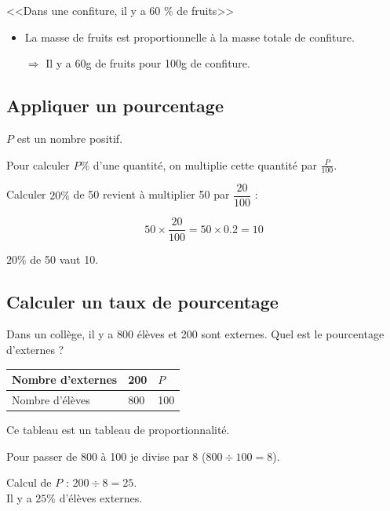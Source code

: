 \documentclass[12pt,a4paper]{article}
\begin{document}
\begin{myex}
	<<Dans une confiture, il y a 60 \% de fruits>>
	\begin{itemize}
		\item La masse de fruits est proportionnelle à la masse totale de confiture.
		\item[$\Rightarrow$] Il y a 60g de fruits pour 100g de confiture.
	\end{itemize}
\end{myex}

\subsection{Appliquer un pourcentage}

\begin{myprop}
	$P$ est un nombre positif.
	
	Pour calculer $P\% $ d'une quantité, on multiplie cette quantité par $\frac{P}{100}$.
\end{myprop}


\begin{myex}
	Calculer $20 \% $ de 50 revient à multiplier 50 par $\dfrac{20}{100}$ :
	
	\begin{equation*}
		50 \times \dfrac{20}{100} = 50 \times \num{0.2} = 10
	\end{equation*}
	
	
	$20 \% $ de 50  vaut 10.
\end{myex}


\subsection{Calculer un taux de pourcentage}


\begin{myex}
	Dans un collège, il y a 800 élèves et 200 sont externes. Quel est le pourcentage d'externes ?\\
	
	
	\begin{tabular}{|l|l|l|}
		\hline
		Nombre d'externes & 200 & $P$ \\ \hline
		Nombre d'élèves   & 800 & 100 \\ \hline
	\end{tabular}
	
	\vspace*{0.5cm}
	
	
	Ce tableau est un tableau de proportionnalité. 
	
	Pour passer de 800 à 100 je divise par 8 ($800 \div 100 = 8$).
	
	Calcul de $P$ : $200 \div 8 = 25$.\\
	
	Il y a $25 \%$ d'élèves externes.
\end{myex}
\end{document}
